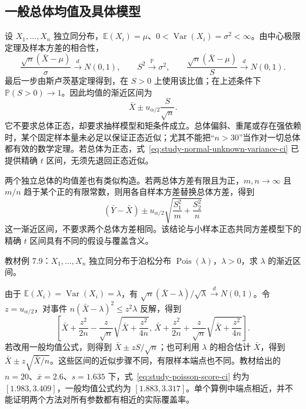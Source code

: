 \subsection{一般总体均值及具体模型}
\label{subsec:study-general-mean-intervals}

设 $X_1,\ldots,X_n$ 独立同分布，$\mathbb E(X_i)=\mu$、$0<\operatorname{Var}(X_i)=\sigma^2<\infty$。由中心极限定理及样本方差的相合性，
\begin{equation}
  \frac{\sqrt n(\bar X-\mu)}\sigma\xrightarrow{d}N(0,1),
  \qquad S^2\xrightarrow{\mathbb P}\sigma^2,
  \qquad
  \frac{\sqrt n(\bar X-\mu)}S\xrightarrow{d}N(0,1).
  \label{eq:study-studentized-mean-clt}
\end{equation}
最后一步由斯卢茨基定理得到，在 $S>0$ 上使用该比值；在上述条件下 $\mathbb P(S>0)\to1$。因此均值的渐近区间为
\begin{equation}
  \bar X\pm u_{\alpha/2}\frac S{\sqrt n}.
  \label{eq:study-general-mean-ci}
\end{equation}
它不要求总体正态，却要求抽样模型和矩条件成立。总体偏斜、重尾或存在强依赖时，某个固定样本量未必足以保证正态近似；尤其不能把“$n>30$”当作对一切总体都有效的数学定理。若总体为正态，式~\eqref{eq:study-normal-unknown-variance-ci} 已提供精确 $t$ 区间，无须先退回正态近似。

两个独立总体的均值差也有类似构造。若两总体方差有限且为正，$m,n\to\infty$ 且 $m/n$ 趋于某个正的有限常数，则用各自样本方差替换总体方差，得到
\[
  (\bar Y-\bar X)\pm u_{\alpha/2}
             \sqrt{\frac{S_1^2}{m}+\frac{S_2^2}{n}}
\]
这一渐近区间，不要求两个总体方差相同。该结论与小样本正态共同方差模型下的精确 $t$ 区间具有不同的假设与覆盖含义。

\begin{example}
\label{ex:study-poisson-mean-interval}
教材例 7.9：$X_1,\ldots,X_n$ 独立同分布于泊松分布 $\operatorname{Pois}(\lambda)$，$\lambda>0$，求 $\lambda$ 的渐近区间。
\end{example}
\begin{solve}
由于 $\mathbb E(X_i)=\operatorname{Var}(X_i)=\lambda$，有 $\sqrt n(\bar X-\lambda)/\sqrt\lambda\xrightarrow{d}N(0,1)$。令 $z=u_{\alpha/2}$，对事件 $n(\bar X-\lambda)^2\le z^2\lambda$ 反解，得到
\begin{equation}
  \left[
    \bar X+\frac{z^2}{2n}
      -\frac z{\sqrt n}\sqrt{\bar X+\frac{z^2}{4n}},\,
    \bar X+\frac{z^2}{2n}
      +\frac z{\sqrt n}\sqrt{\bar X+\frac{z^2}{4n}}
  \right].
  \label{eq:study-poisson-score-ci}
\end{equation}
若改用一般均值公式，则得到 $\bar X\pm zS/\sqrt n$；也可利用 $\lambda$ 的相合估计 $\bar X$，得到 $\bar X\pm z\sqrt{\bar X/n}$。这些区间的近似步骤不同，有限样本端点也不同。教材给出的 $n=20$、$\bar x=2.6$、$s=1.635$ 下，式~\eqref{eq:study-poisson-score-ci} 约为 $[1.983,3.409]$，一般均值公式约为 $[1.883,3.317]$。单个算例中端点相近，并不能证明两个方法对所有参数都有相近的实际覆盖率。
\end{solve}

